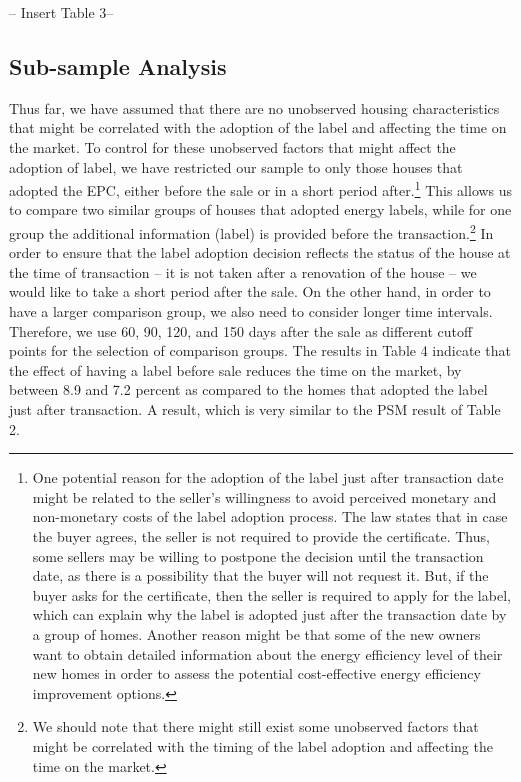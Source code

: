 \documentclass[12pt]{article}
\begin{document}
\begin{center}
-- Insert Table 3--
\end{center} 

\subsection{Sub-sample Analysis}

Thus far, we have assumed that there are no unobserved housing characteristics that might be correlated with the adoption of the label and affecting the time on the market. To control for these unobserved factors that might affect the adoption of label, we have restricted our sample to only those houses that adopted the EPC, either before the sale or in a short period after.\footnote{One potential reason for the adoption of the label just after transaction date might be related to the seller’s willingness to avoid perceived monetary and non-monetary costs of the label adoption process. The law states that in case the buyer agrees, the seller is not required to provide the certificate. Thus, some sellers may be willing to postpone the decision until the transaction date, as there is a possibility that the buyer will not request it. But, if the buyer asks for the certificate, then the seller is required to apply for the label, which can explain why the label is adopted just after the transaction date by a group of homes. Another reason might be that some of the new owners want to obtain detailed information about the energy efficiency level of their new homes in order to assess the potential cost-effective energy efficiency improvement options.} This allows us to compare two similar groups of houses that adopted energy labels, while for one group the additional information (label) is provided before the transaction.\footnote{We should note that there might still exist some unobserved factors that might be correlated with the timing of the label adoption and affecting the time on the market.} In order to ensure that the label adoption decision reflects the status of the house at the time of transaction – it is not taken after a renovation of the house – we would like to take a short period after the sale. On the other hand, in order to have a larger comparison group, we also need to consider longer time intervals. Therefore, we use 60, 90, 120, and 150 days after the sale as different cutoff points for the selection of comparison groups. The results in Table 4 indicate that the effect of having a label before sale reduces the time on the market, by between 8.9 and 7.2 percent as compared to the homes that adopted the label just after transaction. A result, which is very similar to the PSM result of Table 2. 
\end{document}
